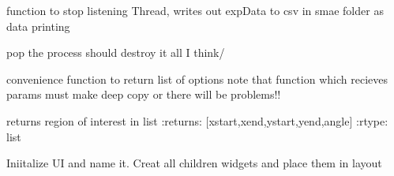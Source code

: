 \documentclass[letterpaper,10pt,english]{sphinxmanual}
\begin{document}
\begin{fulllineitems}

\begin{fulllineitems}
\label{MainWindow:SpinorMonitor.MainWindow.end}
function to stop listening Thread, writes out expData to csv
in smae folder as data printing

\end{fulllineitems}


\begin{fulllineitems}
\label{MainWindow:SpinorMonitor.MainWindow.finish_thread}
pop the process should destroy it all I think/

\end{fulllineitems}


\begin{fulllineitems}
\label{MainWindow:SpinorMonitor.MainWindow.get_options}
convenience function to return list of options
note that function which recieves params must make
deep copy or there will be problems!!

\end{fulllineitems}


\begin{fulllineitems}
\label{MainWindow:SpinorMonitor.MainWindow.get_roi}
returns region of interest in list
:returns: {[}xstart,xend,ystart,yend,angle{]}
:rtype: list

\end{fulllineitems}


\begin{fulllineitems}
\label{MainWindow:SpinorMonitor.MainWindow.initUI}
Iniitalize UI and name it.  Creat all children widgets and place 
them in layout

\end{fulllineitems}



\end{fulllineitems}
\end{document}
